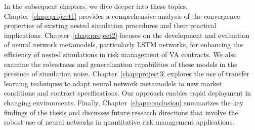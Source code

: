 In the subsequent chapters, we dive deeper into these topics.
Chapter~\ref{chap:project1} provides a comprehensive analysis of the convergence properties of existing nested simulation procedures and their practical implications.
Chapter~\ref{chap:project2} focuses on the development and evaluation of neural network metamodels, particularly LSTM networks, for enhancing the efficiency of nested simulations in risk management of VA contracts.
We also examine the robustness and generalization capabilities of these models in the presence of simulation noise.
Chapter~\ref{chap:project3} explores the use of transfer learning techniques to adapt neural network metamodels to new market conditions and contract specifications.
Our approach enables rapid deployment in changing environments.
Finally, Chapter~\ref{chap:conclusion} summarizes the key findings of the thesis and discusses future research directions that involve the robost use of neural networks in quantitative risk management applications.

